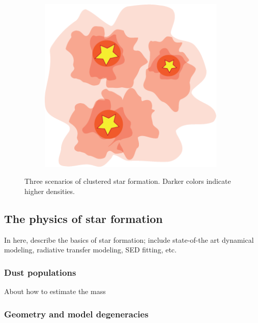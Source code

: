 \begin{figure}[ht!]
\begin{center}
\begin{subfigure}[b]{0.3\textwidth}
\caption{}
\label{subfig:scenarios:b}
\end{subfigure}
\begin{subfigure}[b]{0.3\textwidth}
\centering
\includegraphics[width=0.98\textwidth]{Figures/Coalescence.png} 
\caption{}
\label{subfig:scenarios:c}
\end{subfigure}
\caption[Scenarios of clustered star formation]{Three scenarios of clustered star formation. Darker colors indicate higher densities.}
\label{fig:SFscenarios}
\end{center}
\end{figure}


\subsection{The physics of star formation}

In here, describe the basics of star formation; include state-of-the art dynamical modeling, radiative transfer modeling, SED fitting, etc.

\subsubsection{Dust populations}

About how to estimate the mass

\subsubsection{Geometry and model degeneracies}


